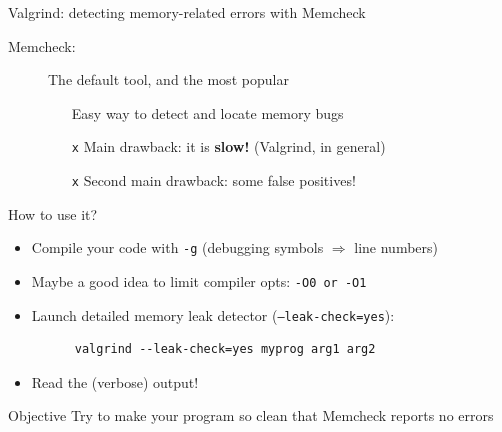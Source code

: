 \documentclass[10pt,xcolor=table]{beamer}
\begin{document}
\begin{frame}[fragile]{Valgrind: detecting memory-related errors with Memcheck}
  \begin{description}
  \item[Memcheck:] The default tool, and the most popular
    \begin{itemize}
    \item[\checkmark] Easy way to detect and locate memory bugs
    \item[{\tt x}] Main drawback: it is {\bf slow!} (Valgrind, in general)
    \item[{\tt x}] Second main drawback: some false positives!
    \end{itemize}
  \end{description}

  \pause

  How to use it?
  \begin{itemize}
  \item Compile your code with {\tt -g} (debugging symbols
    $\Rightarrow$ line numbers)
  \item Maybe a good idea to limit compiler opts: {\tt -O0 or -O1}
  \item Launch detailed memory leak detector ({\tt --leak-check=yes}):
    \begin{lstlisting}
      valgrind --leak-check=yes myprog arg1 arg2
    \end{lstlisting}
  \item Read the (verbose) output!
  \end{itemize}

  \pause

  \begin{exampleblock}{Objective}
    Try to make your program so clean that Memcheck reports no errors
  \end{exampleblock}
\end{frame}
\end{document}

